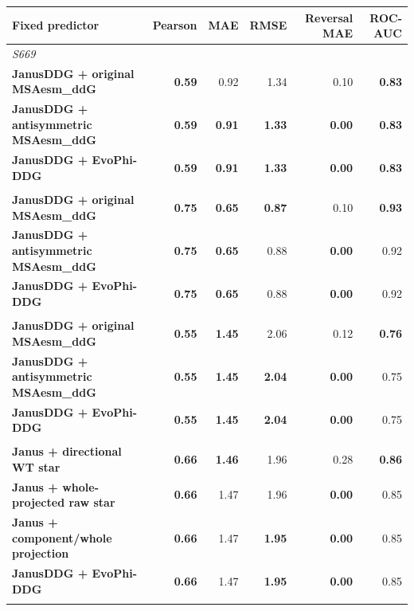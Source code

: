 \begin{tabular}{lrrrrr}\toprule Fixed predictor & Pearson & MAE & RMSE & Reversal MAE & ROC-AUC\\\midrule
\multicolumn{6}{l}{\textit{S669}}\\
\textbf{JanusDDG + original MSAesm\_ddG} & \textbf{0.59} & 0.92 & 1.34 & 0.10 & \textbf{0.83} \\
\textbf{JanusDDG + antisymmetric MSAesm\_ddG} & \textbf{0.59} & \textbf{0.91} & \textbf{1.33} & \textbf{0.00} & \textbf{0.83} \\
\textbf{JanusDDG + EvoPhi-DDG} & \textbf{0.59} & \textbf{0.91} & \textbf{1.33} & \textbf{0.00} & \textbf{0.83} \\
\addlinespace
\multicolumn{6}{l}{\textit{S461}}\\
\textbf{JanusDDG + original MSAesm\_ddG} & \textbf{0.75} & \textbf{0.65} & \textbf{0.87} & 0.10 & \textbf{0.93} \\
\textbf{JanusDDG + antisymmetric MSAesm\_ddG} & \textbf{0.75} & \textbf{0.65} & 0.88 & \textbf{0.00} & 0.92 \\
\textbf{JanusDDG + EvoPhi-DDG} & \textbf{0.75} & \textbf{0.65} & 0.88 & \textbf{0.00} & 0.92 \\
\addlinespace
\multicolumn{6}{l}{\textit{S96}}\\
\textbf{JanusDDG + original MSAesm\_ddG} & \textbf{0.55} & \textbf{1.45} & 2.06 & 0.12 & \textbf{0.76} \\
\textbf{JanusDDG + antisymmetric MSAesm\_ddG} & \textbf{0.55} & \textbf{1.45} & \textbf{2.04} & \textbf{0.00} & 0.75 \\
\textbf{JanusDDG + EvoPhi-DDG} & \textbf{0.55} & \textbf{1.45} & \textbf{2.04} & \textbf{0.00} & 0.75 \\
\addlinespace
\multicolumn{6}{l}{\textit{PTmul-NR}}\\
\textbf{Janus + directional WT star} & \textbf{0.66} & \textbf{1.46} & 1.96 & 0.28 & \textbf{0.86} \\
\textbf{Janus + whole-projected raw star} & \textbf{0.66} & 1.47 & 1.96 & \textbf{0.00} & 0.85 \\
\textbf{Janus + component/whole projection} & \textbf{0.66} & 1.47 & \textbf{1.95} & \textbf{0.00} & 0.85 \\
\textbf{JanusDDG + EvoPhi-DDG} & \textbf{0.66} & 1.47 & \textbf{1.95} & \textbf{0.00} & 0.85 \\
\addlinespace
\bottomrule\end{tabular}
